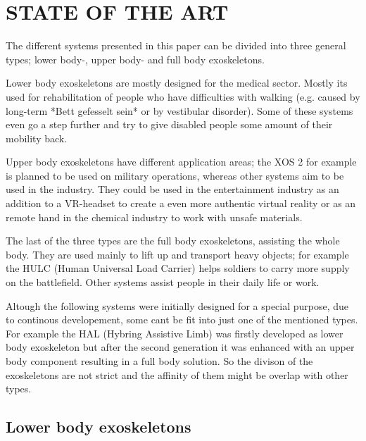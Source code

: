 \documentclass[letterpaper, 10 pt, conference]{ieeeconf}  %
\begin{document}
\section{STATE OF THE ART}

The different systems presented in this paper can be divided into three general types; lower body-, upper body- and full body exoskeletons.


Lower body exoskeletons are mostly designed for the medical sector. Mostly its used for rehabilitation of people who have difficulties with walking (e.g. caused by long-term *Bett gefesselt sein* or by vestibular disorder). Some of these systems even go a step further and try to give disabled people some amount of their mobility back.


Upper body exoskeletons have different application areas; the XOS 2 for example is planned to be used on military operations, whereas other systems aim to be used in the industry. They could be used in the entertainment industry as an addition to a VR-headset to create a even more authentic virtual reality or as an remote hand in the chemical industry to work with unsafe materials.


The last of the three types are the full body exoskeletons, assisting the whole body. They are used mainly to lift up and transport heavy objects; for example the HULC (Human Universal Load Carrier) helps soldiers to carry more supply on the battlefield. Other systems assist people in their daily life or work.


Altough the following systems were initially designed for a special purpose, due to continous developement, some cant be fit into just one of the mentioned types. For example the HAL (Hybring Assistive Limb) was firstly developed as lower body exoskeleton but after the second generation it was enhanced with an upper body component resulting in a full body solution. So the divison of the exoskeletons are not strict and the affinity of them might be overlap with other types.

\subsection{Lower body exoskeletons}
\end{document}
